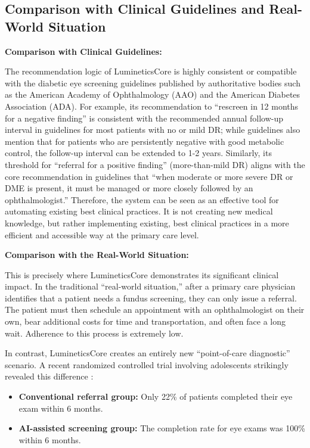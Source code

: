 \documentclass[sigplan,screen]{acmart}
\begin{document}
\subsection{Comparison with Clinical Guidelines and Real-World Situation}

\textbf{Comparison with Clinical Guidelines:}

The recommendation logic of LumineticsCore is highly consistent or compatible with the diabetic eye screening guidelines published by authoritative bodies such as the American Academy of Ophthalmology (AAO) and the American Diabetes Association (ADA). For example, its recommendation to ``rescreen in 12 months for a negative finding'' is consistent with the recommended annual follow-up interval in guidelines for most patients with no or mild DR; while guidelines also mention that for patients who are persistently negative with good metabolic control, the follow-up interval can be extended to 1-2 years. Similarly, its threshold for ``referral for a positive finding'' (more-than-mild DR) aligns with the core recommendation in guidelines that ``when moderate or more severe DR or DME is present, it must be managed or more closely followed by an ophthalmologist.'' Therefore, the system can be seen as an effective tool for automating existing best clinical practices. It is not creating new medical knowledge, but rather implementing existing, best clinical practices in a more efficient and accessible way at the primary care level.

\textbf{Comparison with the Real-World Situation:}

This is precisely where LumineticsCore demonstrates its significant clinical impact. In the traditional ``real-world situation,'' after a primary care physician identifies that a patient needs a fundus screening, they can only issue a referral. The patient must then schedule an appointment with an ophthalmologist on their own, bear additional costs for time and transportation, and often face a long wait. Adherence to this process is extremely low.

In contrast, LumineticsCore creates an entirely new ``point-of-care diagnostic'' scenario. A recent randomized controlled trial involving adolescents strikingly revealed this difference \cite{wolf2024autonomous}:

\begin{itemize}
\item \textbf{Conventional referral group:} Only 22\% of patients completed their eye exam within 6 months.
\item \textbf{AI-assisted screening group:} The completion rate for eye exams was 100\% within 6 months.
\end{itemize}
\end{document}
